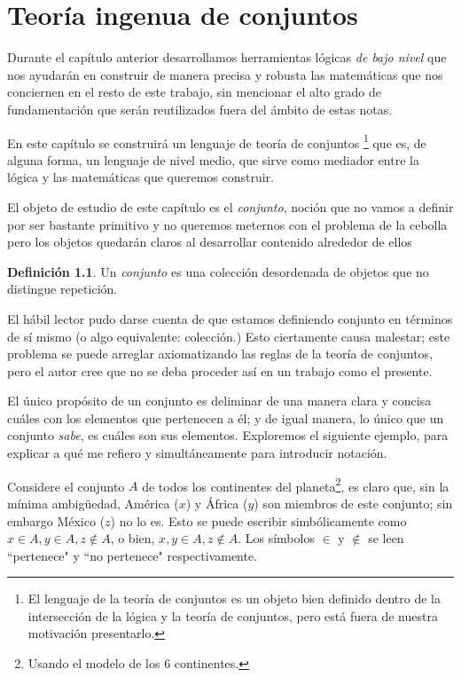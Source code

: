 \documentclass{book}
\theoremstyle{definition}
\newtheorem{df}{Definición}[chapter]
\begin{document}
\chapter{Teoría ingenua de conjuntos}
Durante el capítulo anterior desarrollamos herramientas lógicas \emph{de bajo nivel} que nos ayudarán en construir de manera precisa y robusta las matemáticas que nos conciernen en el resto de este trabajo, sin mencionar el alto grado de fundamentación que serán reutilizados fuera del ámbito de estas notas.

En este capítulo se construirá un lenguaje de teoría de conjuntos
\footnote{El lenguaje de la teoría de conjuntos es un objeto bien definido dentro de la intersección de la lógica y la teoría de conjuntos, pero está fuera de nuestra motivación presentarlo. %
}
que es, de alguna forma, un lenguaje de nivel medio, que sirve como mediador entre la lógica y las matemáticas que queremos construir.

El objeto de estudio de este capítulo es el \emph{conjunto}, noción que no vamos a definir por ser bastante primitivo y no queremos meternos con el problema de la cebolla %
pero los objetos quedarán claros al desarrollar contenido alrededor de ellos

\begin{df} %
	Un \emph{conjunto} es una colección desordenada de objetos que no distingue repetición.
\end{df}

El hábil lector pudo darse cuenta de que estamos definiendo 
conjunto en términos de sí mismo (o algo equivalente: colección.) Esto ciertamente causa malestar; este problema se puede arreglar axiomatizando las reglas de la teoría de conjuntos, pero el autor cree que no se deba proceder así en un trabajo como el presente.   %

El único propósito de un conjunto es deliminar de una manera clara y concisa cuáles con los elementos que pertenecen a él; y de igual manera, lo único que un conjunto \emph{sabe}, es cuáles son sus elementos.
Exploremos el siguiente ejemplo, para explicar a qué me refiero y simultáneamente para introducir notación.

Considere el conjunto $A$ de todos los continentes del planeta\footnote{Usando el modelo de los 6 continentes.}, es claro que, sin la mínima ambigüedad, América ($x$) y África ($y$) son miembros de este conjunto; sin embargo México ($z$) no lo es.
Esto se puede escribir simbólicamente como $x \in A, y\in A, z \notin A$, o bien, $x,y\in A, z\notin A$. 
Los símbolos $\in$ y $\notin$ se leen ``pertenece" y ``no pertenece" respectivamente.
\end{document}
